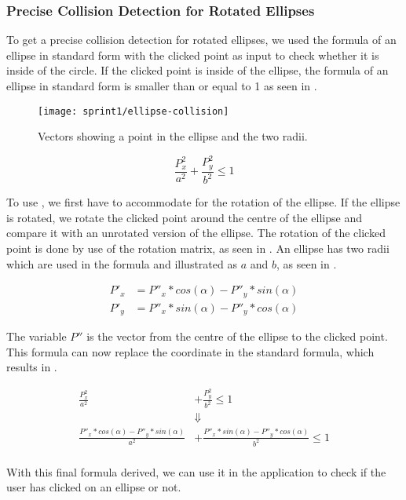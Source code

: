 \subsubsection{Precise Collision Detection for Rotated Ellipses}
To get a precise collision detection for rotated ellipses, we used the formula of an ellipse in standard form with the clicked point as input to check whether it is inside of the circle.
If the clicked point is inside of the ellipse, the formula of an ellipse in standard form is smaller than or equal to 1 as seen in .

\begin{figure}[h]
	\centering
	\texttt{[image: sprint1/ellipse-collision]}
	\caption{Vectors showing a point in the ellipse and the two radii.}
	\label{figure:ellipse-collision}
\end{figure}

\begin{equation}\label{eq:standard-equation}
	\frac{P_x^2}{a^2} + \frac{P_y^2}{b^2} \leq 1
\end{equation}

To use , we first have to accommodate for the rotation of the ellipse.
If the ellipse is rotated, we rotate the clicked point around the centre of the ellipse and compare it with an unrotated version of the ellipse.
The rotation of the clicked point is done by use of the rotation matrix, as seen in .
An ellipse has two radii which are used in the formula and illustrated as $a$ and $b$, as seen in .

\begin{equation}\label{eq:ellipses-rotation-matrix}
\begin{aligned}
	P'_x &= P''_x * cos(\alpha) - P''_y * sin(\alpha)\\
	P'_y &= P''_x * sin(\alpha) - P''_y * cos(\alpha)
\end{aligned}
\end{equation}

The variable $P''$ is the vector from the centre of the ellipse to the clicked point.
This formula can now replace the coordinate in the standard formula, which results in .

\begin{equation}\label{eq:final-ellipses-equation}
\begin{aligned}
	\frac{P_x^2}{a^2} &+ \frac{P_y^2}{b^2} \leq 1	\\
	&\Downarrow\\
	\frac{ P''_x * cos(\alpha) - P''_y * sin(\alpha)}{a^2} &+ \frac{P''_x * sin(\alpha) - P''_y * cos(\alpha)}{b^2} \leq 1\\
\end{aligned}
\end{equation}

With this final formula derived, we can use it in the application to check if the user has clicked on an ellipse or not.